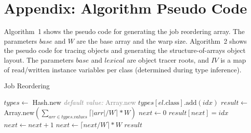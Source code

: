 \documentclass[preprint]{sigplanconf}
\begin{document}






\appendix
\section{Appendix: Algorithm Pseudo Code}
\label{sec:appendix_job_reorder}
\label{sec:appendix_obj_tracer}

Algorithm~1 shows the pseudo code for generating the job reordering array. The parameters $\mathit{base}$ and $W$ are the base array and the warp size. Algorithm~2 shows the pseudo code for tracing objects and generating the structure-of-arrays object layout. The parameters $\mathit{base}$ and $\mathit{lexical}$ are object tracer roots, and $\mathit{IV}$ is a map of read/written instance variables per class (determined during type inference).

\begin{algorithm}[!h]
\caption{Job Reordering}
\label{CHalgorithm}
\begin{algorithmic}[1]
\State $\mathit{types} \gets$ Hash.new \hfill \textcolor{gray}{\textit{default value:} Array.new}
    \State $\mathit{types}[\mathit{el}.\mbox{class}].\mbox{add}(\mathit{idx})$
\EndFor
\State $\mathit{result} \gets$ Array.new$(\sum_{\mathit{arr} \in \mathit{types}.\mathit{values}} \lceil |\mathit{arr}| / W \rceil * W)$
\State $\mathit{next} \gets 0$
        \State $\mathit{result}[\mathit{next}] = \mathit{idx}$
        \State $\mathit{next} \gets \mathit{next} + 1$
    \EndFor
    \State $\mathit{next} \gets \lceil \mathit{next} / W \rceil * W$
\EndFor
\State \Return $\mathit{result}$
\EndProcedure
\end{algorithmic}
\end{algorithm}
\end{document}
